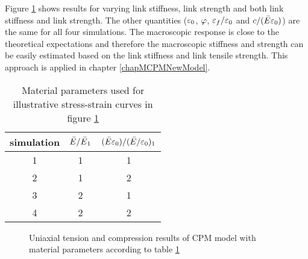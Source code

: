 Figure \ref{figDemCpmUniaxResults} shows results for varying link stiffness, link strength and both link stiffness and link strength.
The other quantities ($\varepsilon_0$, $\varphi$, $\varepsilon_f/\varepsilon_0$ and $\cohesion/(\linkMaterialStiffnessNormal\strainO)$) are the same for all four simulations.
The macroscopic response is close to the theoretical expectations and therefore the macroscopic stiffness and strength can be easily estimated based on the link stiffness and link tensile strength.
This approach is applied in chapter \ref{chapMCPMNewModel}.

\begin{table}
	\centering
	\caption{Material parameters used for illustrative stress-strain curves in figure \ref{figDemCpmUniaxResults}}
	\begin{tabular}{|c||c|c|}
		\hline
		simulation & $\linkMaterialStiffnessNormal/\linkMaterialStiffnessNormal_1$ & $(\linkMaterialStiffnessNormal\strainO)/(\linkMaterialStiffnessNormal/\strainO)_1$ \\
		\hline
		\hline
		1 & 1 & 1 \\
		\hline
		2 & 1 & 2 \\
		\hline
		3 & 2 & 1 \\
		\hline
		4 & 2 & 2 \\
		\hline
	\end{tabular}
	\label{tabDemCpmParamsIllustration}
\end{table}

\begin{figure}
	\centering
	\caption[Uniaxial tension and compression results of CPM model]{Uniaxial tension and compression results of CPM model with material parameters according to table \ref{tabDemCpmParamsIllustration}}
	\label{figDemCpmUniaxResults}
\end{figure}
